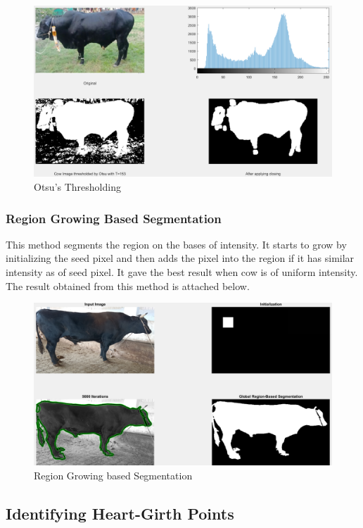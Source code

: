 \documentclass{article}
\begin{document}
\begin{figure}[h]
    \centering
    \includegraphics [scale=0.25] {otsu}
    \caption{Otsu's Thresholding}
    \end{figure}

\subsubsection{Region Growing Based Segmentation}

This method segments the region on the bases of intensity. It starts to grow by initializing the seed pixel and then adds the pixel into the region if it has similar intensity as of seed pixel. It gave the best result when cow is of uniform intensity. The result obtained from this method is attached below.

\begin{figure}[h]
    \centering
    \includegraphics [scale=0.25] {r_g}
    \caption{Region Growing based Segmentation}
    \end{figure}


\subsection{Identifying Heart-Girth Points }
\end{document}
